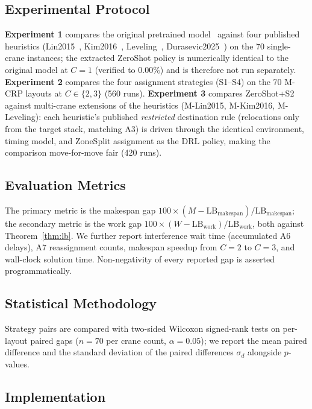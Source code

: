 \documentclass[11pt,a4paper]{elsarticle}
\newcommand{\LB}{\text{LB}}
\begin{document}
\subsection{Experimental Protocol}

\textbf{Experiment 1} compares the original pretrained model~\cite{shin2026} against four published heuristics (Lin2015~\cite{lin2015}, Kim2016~\cite{kim2016}, Leveling~\cite{zehendner2017}, Durasevic2025~\cite{durasevic2025}) on the 70 single-crane instances; the extracted ZeroShot policy is numerically identical to the original model at $C=1$ (verified to $0.00\%$) and is therefore not run separately. \textbf{Experiment 2} compares the four assignment strategies (S1--S4) on the 70 M-CRP layouts at $C\in\{2,3\}$ (560 runs). \textbf{Experiment 3} compares ZeroShot+S2 against multi-crane extensions of the heuristics (M-Lin2015, M-Kim2016, M-Leveling): each heuristic's published \emph{restricted} destination rule (relocations only from the target stack, matching A3) is driven through the identical environment, timing model, and ZoneSplit assignment as the DRL policy, making the comparison move-for-move fair (420 runs).

\subsection{Evaluation Metrics}

The primary metric is the makespan gap $100 \times (M - \LB_{\text{makespan}})/\LB_{\text{makespan}}$; the secondary metric is the work gap $100 \times (W - \LB_{\text{work}})/\LB_{\text{work}}$, both against Theorem~\ref{thm:lb}. We further report interference wait time (accumulated A6 delays), A7 reassignment counts, makespan speedup from $C=2$ to $C=3$, and wall-clock solution time. Non-negativity of every reported gap is asserted programmatically.

\subsection{Statistical Methodology}

Strategy pairs are compared with two-sided Wilcoxon signed-rank tests on per-layout paired gaps ($n=70$ per crane count, $\alpha=0.05$); we report the mean paired difference and the standard deviation of the paired differences $\sigma_d$ alongside $p$-values.

\subsection{Implementation}
\end{document}
